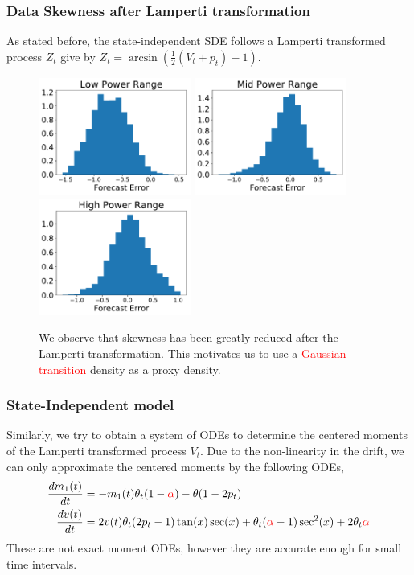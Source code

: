 \documentclass[aspectratio=169]{beamer}\usepackage[utf8]{inputenc}
\begin{document}
\begin{frame}\frametitle{Data Skewness after Lamperti transformation}
As stated before, the state-independent SDE follows a Lamperti transformed process $Z_t$ give by $Z_t = \arcsin \left( \frac{1}{2} \left( V_t+p_t \right) - 1 \right) $.
\begin{figure}
  \includegraphics[width=50mm,scale=1]{plots/hist_low_lamperti.pdf}
  \includegraphics[width=50mm,scale=1]{plots/hist_mid_lamperti.pdf}
  \includegraphics[width=50mm,scale=1]{plots/hist_high_lamperti.pdf}
  \caption{We observe that skewness has been greatly reduced after the Lamperti transformation. This motivates us to use a \textcolor{red}{Gaussian transition} density as a proxy density.}
\end{figure}
\end{frame}

\begin{frame}\frametitle{State-Independent model}
Similarly, we try to obtain a system of ODEs to determine the centered moments of the Lamperti transformed process $V_t$. Due to the non-linearity in the drift, we can only approximate the centered moments by the following ODEs,
\begin{equation}
\begin{split}
\frac{d m_1 (t)}{dt} &= - m_1(t)\theta_t (1-\textcolor{red}{\alpha}) - \theta (1-2 p_t) \\
\frac{d v(t)}{dt} &=  2 v(t) \theta_t (2p_t - 1 ) \tan(x) \sec(x) + \theta_t (\textcolor{red}{\alpha} - 1) \sec^2(x)  + 2 \theta_t \textcolor{red}{\alpha}\\
\end{split}
\end{equation}
These are not exact moment ODEs, however they are accurate enough for small time intervals.
\end{frame}
\end{document}
